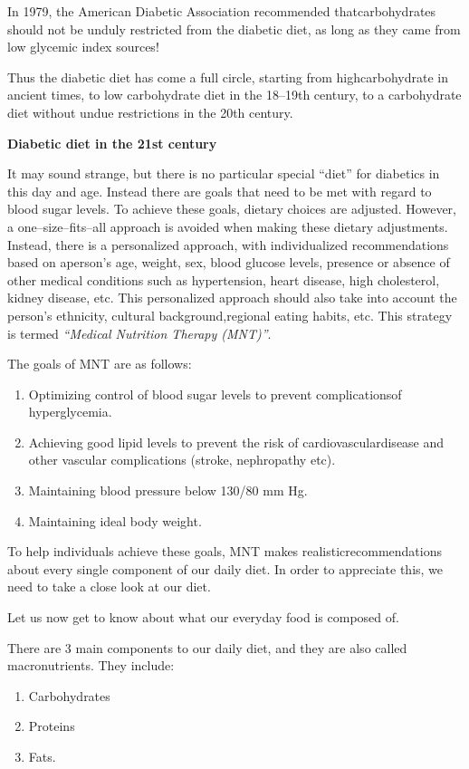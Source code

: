 In 1979, the American Diabetic Association recommended that\break carbohydrates should not be unduly restricted from the diabetic diet, as long as they came from low glycemic index sources!

Thus the diabetic diet has come a full circle, starting from high\break carbohydrate in ancient times, to low carbohydrate diet in the 18–19th century, to a carbohydrate diet without undue restrictions in the 20th century.

\noindent\textbf{Diabetic diet in the 21st century}

It may sound strange, but there is no particular special “diet” for diabetics in this day and age. Instead there are goals that need to be met with regard to blood sugar levels. To achieve these goals, dietary choices are adjusted. However, a one–size–fits–all approach is avoided when making these dietary adjustments. Instead, there is a persona\-lized approach, with individualized recommendations based on a\break person’s age, weight, sex, blood glucose levels, presence or absence of other medical conditions such as hypertension, heart disease, high cholesterol, kidney disease, etc. This personalized approach should also take into account the person’s ethnicity, cultural background,\break regional eating habits, etc. This strategy is termed \textit{“Medical Nutrition Therapy (MNT)”}.

\clearpage
\noindent The goals of MNT are as follows:
\begin{enumerate}[•]
\itemsep=0pt
\item Optimizing control of blood sugar levels to prevent complications\break of hyperglycemia.
\item Achieving good lipid levels to prevent the risk of cardiovascular\break disease and other vascular complications (stroke, nephropathy etc).
\item Maintaining blood pressure below 130/80 mm Hg.
\item Maintaining ideal body weight.
\end{enumerate}

To help individuals achieve these goals, MNT makes realistic\break recommendations about every single component of our daily diet. In order to appreciate this, we need to take a close look at our diet.

Let us now get to know about what our everyday food is composed of.

There are 3 main components to our daily diet, and they are also called macronutrients. They include:
\begin{enumerate}
\itemsep=0pt
\item Carbohydrates
\item Proteins
\item Fats.
\end{enumerate}


